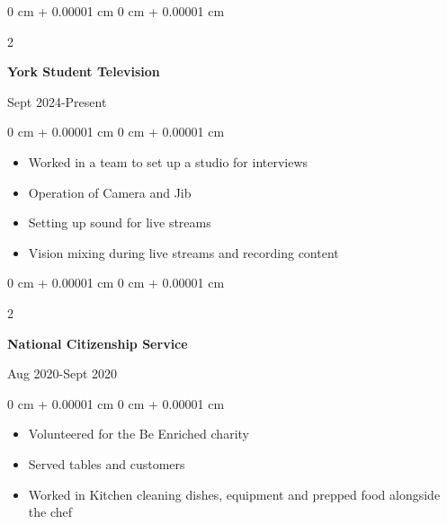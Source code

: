 \documentclass[10pt, letterpaper]{article}
\newenvironment{onecolentry}{
    \begin{adjustwidth}{
        0 cm + 0.00001 cm
    }{
        0 cm + 0.00001 cm
    }
}{
    \end{adjustwidth}
} %
\newenvironment{twocolentry}[2][]{
    \onecolentry
    \def\secondColumn{#2}
    \setcolumnwidth{\fill, 4.5 cm}
    \begin{paracol}{2}
}{
    \switchcolumn \raggedleft \secondColumn
    \end{paracol}
    \endonecolentry
} %
\begin{document}
\begin{samepage}
\begin{samepage}
        \vspace{0.10 cm}


    \begin{twocolentry}{
              Sept 2024-Present
            }
                \textbf{York Student Television}

                \vspace{0.10 cm}
            \end{twocolentry}


            \vspace{0.10 cm}

            \begin{onecolentry}
                \begin{itemize}
                    \item Worked in a team to set up a studio for interviews
                    \item Operation of Camera and Jib
                    \item Setting up sound for live streams
                    \item Vision mixing during live streams and recording content
                \end{itemize}
            \end{onecolentry}

            \vspace{0.10 cm}

        \begin{twocolentry}{
                Aug 2020-Sept 2020
            }
                \textbf{National Citizenship Service}

                \vspace{0.10 cm}
            \end{twocolentry}


            \vspace{0.10 cm}

            \begin{onecolentry}
                \begin{itemize}
                    \item Volunteered for the Be Enriched charity
                    \item Served tables and customers
                    \item Worked in Kitchen cleaning dishes, equipment and prepped food alongside the chef
                \end{itemize}
            \end{onecolentry}
        

\end{samepage}
\end{samepage}
\end{document}
